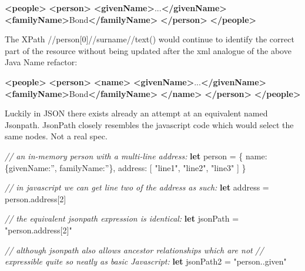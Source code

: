 \documentclass[]{article}
\newenvironment{Shaded}{}{}
\newcommand{\KeywordTok}[1]{\textcolor[rgb]{0.00,0.44,0.13}{\textbf{{#1}}}}
\newcommand{\DataTypeTok}[1]{\textcolor[rgb]{0.56,0.13,0.00}{{#1}}}
\newcommand{\DecValTok}[1]{\textcolor[rgb]{0.25,0.63,0.44}{{#1}}}
\newcommand{\StringTok}[1]{\textcolor[rgb]{0.25,0.44,0.63}{{#1}}}
\newcommand{\CommentTok}[1]{\textcolor[rgb]{0.38,0.63,0.69}{\textit{{#1}}}}
\newcommand{\OtherTok}[1]{\textcolor[rgb]{0.00,0.44,0.13}{{#1}}}
\newcommand{\FunctionTok}[1]{\textcolor[rgb]{0.02,0.16,0.49}{{#1}}}
\newcommand{\NormalTok}[1]{{#1}}
\begin{document}
\begin{Shaded}
\begin{Highlighting}[]
\KeywordTok{<people>}
   \KeywordTok{<person>}
      \KeywordTok{<givenName>}\NormalTok{...}\KeywordTok{</givenName>}   
      \KeywordTok{<familyName>}\NormalTok{Bond}\KeywordTok{</familyName>}
   \KeywordTok{</person>}
\KeywordTok{</people>}
\end{Highlighting}
\end{Shaded}

The XPath //person{[}0{]}//surname//text() would continue to identify
the correct part of the resource without being updated after the xml
analogue of the above Java Name refactor:

\begin{Shaded}
\begin{Highlighting}[]
\KeywordTok{<people>}
   \KeywordTok{<person>}
      \KeywordTok{<name>}
         \KeywordTok{<givenName>}\NormalTok{...}\KeywordTok{</givenName>}
         \KeywordTok{<familyName>}\NormalTok{Bond}\KeywordTok{</familyName>}
      \KeywordTok{</name>}
   \KeywordTok{</person>}
\KeywordTok{</people>}
\end{Highlighting}
\end{Shaded}

Luckily in JSON there exists already an attempt at an equivalent named
Jsonpath. JsonPath closely resembles the javascript code which would
select the same nodes. Not a real spec.

\begin{Shaded}
\begin{Highlighting}[]

\CommentTok{// an in-memory person with a multi-line address:}
\KeywordTok{let} \NormalTok{person = \{}
   \DataTypeTok{name}\NormalTok{: \{}\DataTypeTok{givenName}\NormalTok{:}\StringTok{''}\NormalTok{, }\DataTypeTok{familyName}\NormalTok{:}\StringTok{''}\NormalTok{\},}
   \DataTypeTok{address}\NormalTok{: [}
      \StringTok{"line1"}\NormalTok{,}
      \StringTok{"line2"}\NormalTok{,}
      \StringTok{"line3"}
   \NormalTok{]}
\NormalTok{\}}


\CommentTok{// in javascript we can get line two of the address as such:}
\KeywordTok{let} \NormalTok{address = }\OtherTok{person}\NormalTok{.}\FunctionTok{address}\NormalTok{[}\DecValTok{2}\NormalTok{]}

\CommentTok{// the equivalent jsonpath expression is identical:}
\KeywordTok{let} \NormalTok{jsonPath = }\StringTok{"person.address[2]"}

\CommentTok{// although jsonpath also allows ancestor relationships which are not}
\CommentTok{// expressible quite so neatly as basic Javascript:}
\KeywordTok{let} \NormalTok{jsonPath2 = }\StringTok{"person..given"}
\end{Highlighting}
\end{Shaded}
\end{document}
